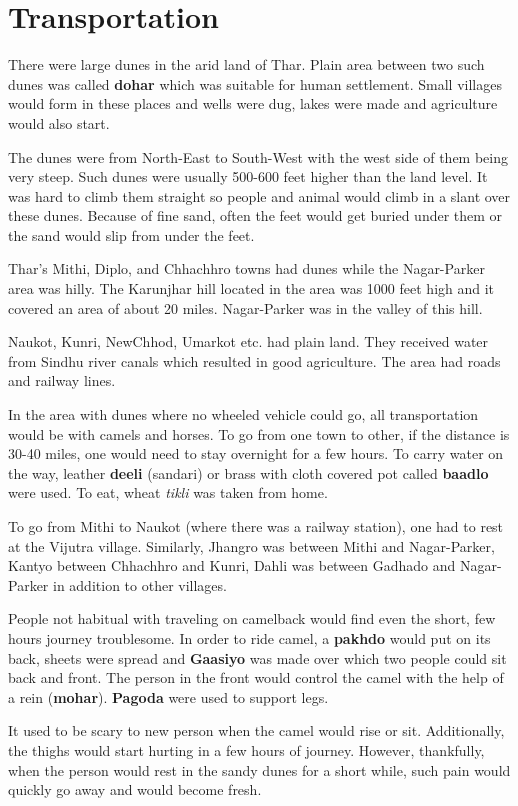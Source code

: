 \chapter{Transportation}
There were large dunes in the arid land of Thar. Plain area between two such
dunes was called \textbf{dohar} which was suitable for human settlement. Small
villages would form in these places and wells were dug, lakes were made and
agriculture would also start.

The dunes were from North-East to South-West with the west side of them being
very steep. Such dunes were usually 500-600 feet higher than the land level. It
was hard to climb them straight so people and animal would climb in a slant
over these dunes. Because of fine sand, often the feet would get buried under
them or the sand would slip from under the feet.

Thar's Mithi, Diplo, and Chhachhro towns had dunes while the Nagar-Parker area
was hilly. The Karunjhar hill located in the area was 1000 feet high and it
covered an area of about 20 miles. Nagar-Parker was in the valley of this hill.

Naukot, Kunri, NewChhod, Umarkot etc. had plain land. They received water from
Sindhu river canals which resulted in good agriculture. The area had roads and
railway lines. 

In the area with dunes where no wheeled vehicle could go, all transportation
would be with camels and horses. To go from one town to other, if the distance
is 30-40 miles, one would need to stay overnight for a few hours. To carry
water on the way, leather \textbf{deeli} (sandari) or brass with cloth covered
pot called \textbf{baadlo} were used. To eat, wheat \textit{tikli} was taken
from home.

To go from Mithi to Naukot (where there was a railway station), one had to rest
at the Vijutra village. Similarly, Jhangro was between Mithi and Nagar-Parker,
Kantyo between Chhachhro and Kunri, Dahli was between Gadhado and Nagar-Parker
in addition to other villages.

People not habitual with traveling on camelback would find even the short, few
hours journey troublesome. In order to ride camel, a \textbf{pakhdo} would put
on its back, sheets were spread and \textbf{Gaasiyo} was made over which two
people could sit back and front. The person in the front would control the
camel with the help of a rein (\textbf{mohar}). \textbf{Pagoda} were used to
support legs.

It used to be scary to new person when the camel would rise or sit.
Additionally, the thighs would start hurting in a few hours of journey.
However, thankfully, when the person would rest in the sandy dunes for a short
while, such pain would quickly go away and would become fresh.

